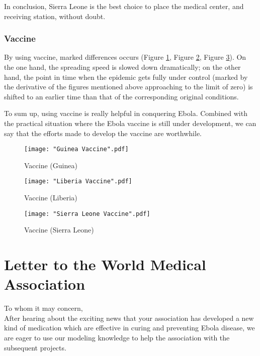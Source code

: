 \documentclass[12pt]{article}
\begin{document}
In conclusion, Sierra Leone is the best choice to place the medical center, and receiving station, without doubt.

\subsubsection{Vaccine}

By using vaccine, marked differences occurs (Figure \ref{GuineaVaccine}, Figure \ref{LiberiaVaccine}, Figure \ref{SierraLeoneVaccine}). On the one hand, the spreading speed is slowed down dramatically; on the other hand, the point in time when the epidemic gets fully under control (marked by the derivative of the figures mentioned above approaching to the limit of zero) is shifted to an earlier time than that of the corresponding original conditions.

To sum up, using vaccine is really helpful in conquering Ebola. Combined with the practical situation where the Ebola vaccine is still under development, we can say that the efforts made to develop the vaccine are worthwhile.

\begin{figure}[htbp]
\centerline{\texttt{[image: "Guinea Vaccine".pdf]}}
\caption{Vaccine (Guinea)}
\label{GuineaVaccine}
\end{figure}

\begin{figure}[htbp]
\centerline{\texttt{[image: "Liberia Vaccine".pdf]}}
\caption{Vaccine (Liberia)}
\label{LiberiaVaccine}
\end{figure}

\begin{figure}[htbp]
\centerline{\texttt{[image: "Sierra Leone Vaccine".pdf]}}
\caption{Vaccine (Sierra Leone)}
\label{SierraLeoneVaccine}
\end{figure}


\section{Letter to the World Medical Association}%


To whom it may concern, \\

    After hearing about the exciting news that your association has developed a new kind of medication which are effective in curing and preventing Ebola disease, we are eager to use our modeling knowledge to help the association with the subsequent projects. 
    
\end{document}
